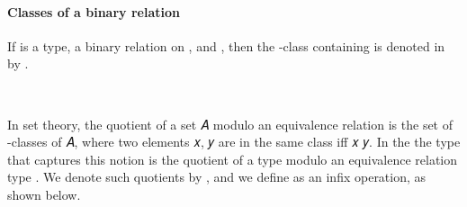 \documentclass[a4paper,USenglish,cleveref,autoref,thm-restate]{lipics-v2019}
\begin{document}
\paragraph*{Classes of a binary relation}
If \AgdaSpace{}\AgdaSymbol{:}\AgdaSpace{} is a type,
\AgdaBound{\Aapprox } a binary relation on , and \AgdaSpace{}\AgdaSymbol{:}\AgdaSpace{},
then the \AgdaBound{\Aapprox }-class containing  is denoted in \agdaualib by
\AgdaOperator{\AgdaFunction{[}}\AgdaSpace{}\AgdaSpace{}\AgdaOperator{\AgdaFunction{]}}\AgdaSpace{}\AgdaBound{\Aapprox }.
\begin{code}
\>[0]\AgdaOperator{\AgdaFunction{[\AgdaUnderscore{}]\AgdaUnderscore{}}}\AgdaSpace{}%
\AgdaSymbol{:}%
\>[8]\AgdaSymbol{\{}\AgdaSpace{}%
\AgdaSymbol{:}\AgdaSpace{}%
\AgdaSpace{}%
\AgdaSpace{}%
\AgdaSymbol{\}}\AgdaSpace{}%
%
\>[22]\AgdaSymbol{(}\AgdaSpace{}%
\AgdaSymbol{:}\AgdaSpace{}%
\AgdaSymbol{)}\AgdaSpace{}%
\AgdaSpace{}%
\AgdaSpace{}%
\AgdaSpace{}%
\AgdaSpace{}%
\AgdaSpace{}%
\AgdaSpace{}%
\AgdaSpace{}%
\AgdaSpace{}%
\<%
\\
\>[0]\AgdaOperator{\AgdaFunction{[}}\AgdaSpace{}%
\AgdaSpace{}%
\AgdaOperator{\AgdaFunction{]}}\AgdaSpace{}%
\AgdaBound{\Aapprox }\AgdaSpace{}%
\AgdaSymbol{=}\AgdaSpace{}%
\AgdaSpace{}%
\AgdaSpace{}%
\AgdaSpace{}%
\AgdaSymbol{\AgdaUnderscore{}}\AgdaSpace{}%
\AgdaFunction{,}%
\>[21]\AgdaBound{\Aapprox }\AgdaSpace{}%
\AgdaSpace{}%
\<%
\end{code}
In set theory, the quotient of a set 𝐴 modulo an equivalence relation \Aapprox  is the set of \Aapprox -classes of 𝐴, where two elements 𝑥, 𝑦 are in the same class iff 𝑥 \Aapprox  𝑦. In the \agdaualib the type that captures this notion is the quotient of a type  modulo an equivalence relation type \AgdaBound{\Aapprox }. We denote such quotients by \AgdaSpace{}\AgdaOperator{\AgdaFunction{//}}\AgdaSpace{}\AgdaBound{\Aapprox }, and we define \AgdaOperator{\AgdaFunction{\AgdaUnderscore{}//\AgdaUnderscore{}}}\AgdaSpace{} as an infix operation, as shown below.
\end{document}
